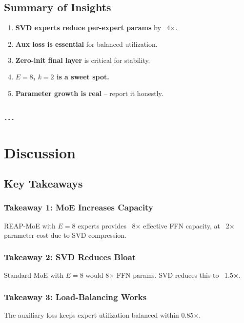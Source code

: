\subsection{Summary of Insights}

\begin{enumerate}
\item \textbf{SVD experts reduce per-expert params} by ~4$\times$.
\item \textbf{Aux loss is essential} for balanced utilization.
\item \textbf{Zero-init final layer} is critical for stability.
\item \textbf{$E = 8$, $k = 2$ is a sweet spot.}
\item \textbf{Parameter growth is real} -- report it honestly.
\end{enumerate}
\begin{lstlisting}

---
\end{lstlisting}

\section{Discussion}

\subsection{Key Takeaways}

\subsubsection{Takeaway 1: MoE Increases Capacity}

REAP-MoE with $E = 8$ experts provides ~8$\times$ effective FFN capacity, at ~2$\times$ 
parameter cost due to SVD compression.

\subsubsection{Takeaway 2: SVD Reduces Bloat}

Standard MoE with $E = 8$ would 8$\times$ FFN params. SVD reduces this to ~1.5$\times$.

\subsubsection{Takeaway 3: Load-Balancing Works}

The auxiliary loss keeps expert utilization balanced within 0.85$\times$.


